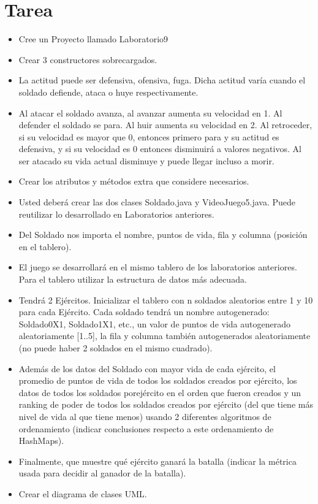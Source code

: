 \documentclass{article}
\begin{document}
	\section{Tarea}
	\begin{itemize}		
        \item Cree un Proyecto llamado Laboratorio9
        \item Crear 3 constructores sobrecargados.
        \item La actitud puede ser defensiva, ofensiva, fuga. Dicha actitud varía cuando el soldado defiende, ataca o huye respectivamente.
        \item Al atacar el soldado avanza, al avanzar aumenta su velocidad en 1. Al defender el soldado se para. Al huir aumenta su velocidad en 2. Al retroceder, si su velocidad es mayor que 0, entonces primero para y su actitud es defensiva, y si su velocidad es 0 entonces disminuirá a valores negativos. Al ser atacado su vida actual disminuye y puede llegar incluso a morir.
        \item Crear los atributos y métodos extra que considere necesarios.
		\item Usted deberá crear las dos clases Soldado.java y VideoJuego5.java. Puede reutilizar lo desarrollado en Laboratorios anteriores.
		\item Del Soldado nos importa el nombre, puntos de vida, fila y columna (posición en el tablero).
		\item El juego se desarrollará en el mismo tablero de los laboratorios anteriores. Para el tablero utilizar la estructura de datos más adecuada.
		\item Tendrá 2 Ejércitos. Inicializar el tablero con n soldados aleatorios entre 1 y 10 para cada Ejército. Cada soldado tendrá un nombre autogenerado: Soldado0X1, Soldado1X1, etc., un valor de puntos de vida autogenerado aleatoriamente [1..5], la fila y columna también autogenerados aleatoriamente (no puede haber 2 soldados en el mismo cuadrado). 
		\item Además de los datos del Soldado con mayor vida de cada ejército, el promedio de puntos de vida de todos los soldados creados por ejército, los datos de todos los soldados porejército en el orden que fueron creados y un ranking de poder de todos los soldados creados por ejército (del que tiene más nivel de vida al que tiene menos) usando 2 diferentes algoritmos de ordenamiento (indicar conclusiones respecto a este ordenamiento de HashMaps).
		\item Finalmente, que muestre qué ejército ganará la batalla (indicar la métrica usada para decidir al ganador de la batalla).
		\item Crear el diagrama de clases UML.
	\end{itemize}
\end{document}
